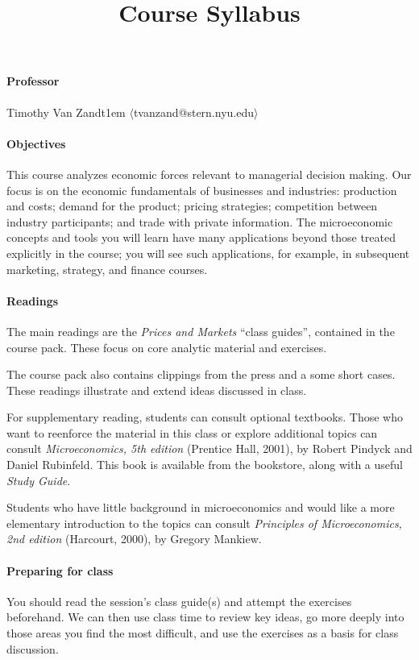 \documentclass[11pt]{article}
\title{Course Syllabus}
\begin{document}
\makehead

\paragraph*{Professor}
Timothy Van Zandt\kern 1em $\langle$tvanzand@stern.nyu.edu$\rangle$


\paragraph*{Objectives}
This course analyzes economic forces relevant to managerial decision making. Our focus is on the economic fundamentals of businesses and industries: production and costs; demand for the product; pricing strategies; competition between industry participants; and trade with private information. The microeconomic concepts and tools you will learn have many applications beyond those treated explicitly in the  course; you will see such applications, for example, in subsequent marketing, strategy, and finance courses.

\paragraph*{Readings}
The main readings are the \emph{Prices and Markets} ``class guides'', contained in the course pack. These focus on core analytic material and exercises.

The course pack also contains clippings from the press and a some short cases. These readings illustrate and extend ideas discussed in class.

For supplementary reading, students can consult optional textbooks. Those who want to reenforce the material in this class or explore additional topics can consult \emph{Microeconomics, 5th edition} (Prentice Hall, 2001), by  Robert Pindyck and Daniel Rubinfeld. This book is available from the bookstore, along with a useful \emph{Study Guide}.

Students who have little background in microeconomics and would like a more elementary introduction to the topics can consult \emph{Principles of Microeconomics, 2nd edition} (Harcourt, 2000), by Gregory Mankiew.

\paragraph*{Preparing for class}

You should read the session's class guide(s) and attempt the exercises  beforehand. We can then use class time to review key ideas, go more deeply into those areas you find the most difficult, and use the exercises as a basis for class discussion.
\end{document}
